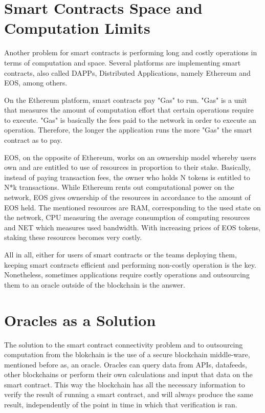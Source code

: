 \section{Smart Contracts Space and Computation Limits}

Another problem for smart contracts is performing long and costly operations in terms of computation and space. Several platforms are implementing smart contracts, also called DAPPs, Distributed Applications, namely Ethereum and EOS, among others. 

On the Ethereum platform, smart contracts pay "Gas" to run. "Gas" is a unit that measures the amount of computation effort that certain operations require to execute. "Gas" is basically the fees paid to the network in order to execute an operation. Therefore, the longer the application runs the more "Gas" the smart contract as to pay.

EOS, on the opposite of Ethereum, works on an ownership model whereby users own and are entitled to use of resources in proportion to their stake. Basically, instead of paying transaction fees, the owner who holds N tokens is entitled to N*k transactions. While Ethereum rents out computational power on the network, EOS gives ownership of the resources in accordance to the amount of EOS held. The mentioned resources are RAM, corresponding to the used state on the network, CPU measuring the average consumption of computing resources and NET which measures used bandwidth. With increasing prices of EOS tokens, staking these resources becomes very costly.

All in all, either for users of smart contracts or the teams deploying them, keeping smart contracts efficient and performing non-costly operation is the key. Nonetheless, sometimes applications require costly operations and outsourcing them to an oracle outside of the blockchain is the answer.


\section{Oracles as a Solution}
The solution to the smart contract connectivity problem and to outsourcing computation from the blokchain is the use of a secure blockchain middle-ware, mentioned before as, an oracle. Oracles can query data from APIs, datafeeds, other blockchains or perform their own calculations and input that data on the smart contract. This way the blockchain has all the necessary information to verify the result of running a smart contract, and will always produce the same result, independently of the point in time in which that verification is ran.


